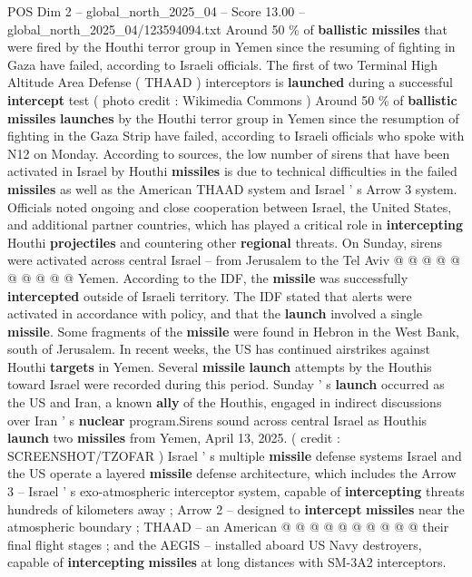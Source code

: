 \begin{textsample}{POS Dim 2 – global\_north\_2025\_04 – Score 13.00 – global\_north\_2025\_04/123594094.txt}  \label{ex:f2_pos_430}
Around 50 \% of \textbf{ballistic} \textbf{missiles} that were fired by the Houthi terror group in Yemen since the resuming of fighting in Gaza have failed, according to Israeli officials.
The first of two Terminal High Altitude Area Defense ( THAAD ) interceptors is \textbf{launched} during a successful \textbf{intercept} test ( photo credit : Wikimedia Commons ) Around 50 \% of \textbf{ballistic} \textbf{missiles} \textbf{launches} by the Houthi terror group in Yemen since the resumption of fighting in the Gaza Strip have failed, according to Israeli officials who spoke with N12 on Monday.
According to sources, the low number of sirens that have been activated in Israel by Houthi \textbf{missiles} is due to technical difficulties in the failed \textbf{missiles} as well as the American THAAD system and Israel ' s Arrow 3 system.
Officials noted ongoing and close cooperation between Israel, the United States, and additional partner countries, which has played a critical role in \textbf{intercepting} Houthi \textbf{projectiles} and countering other \textbf{regional} threats.
On Sunday, sirens were activated across central Israel -- from Jerusalem to the Tel Aviv @ @ @ @ @ @ @ @ @ @ Yemen.
According to the IDF, the \textbf{missile} was successfully \textbf{intercepted} outside of Israeli territory.
The IDF stated that alerts were activated in accordance with policy, and that the \textbf{launch} involved a single \textbf{missile}.
Some fragments of the \textbf{missile} were found in Hebron in the West Bank, south of Jerusalem.
In recent weeks, the US has continued airstrikes against Houthi \textbf{targets} in Yemen.
Several \textbf{missile} \textbf{launch} attempts by the Houthis toward Israel were recorded during this period.
Sunday ' s \textbf{launch} occurred as the US and Iran, a known \textbf{ally} of the Houthis, engaged in indirect discussions over Iran ' s \textbf{nuclear} program.Sirens sound across central Israel as Houthis \textbf{launch} two \textbf{missiles} from Yemen, April 13, 2025. ( credit : SCREENSHOT/TZOFAR ) Israel ' s multiple \textbf{missile} defense systems Israel and the US operate a layered \textbf{missile} defense architecture, which includes the Arrow 3 -- Israel ' s exo-atmospheric interceptor system, capable of \textbf{intercepting} threats hundreds of kilometers away ; Arrow 2 -- designed to \textbf{intercept} \textbf{missiles} near the atmospheric boundary ; THAAD -- an American @ @ @ @ @ @ @ @ @ @ their final flight stages ; and the AEGIS -- installed aboard US Navy destroyers, capable of \textbf{intercepting} \textbf{missiles} at long distances with SM-3A2 interceptors.

\end{textsample}
